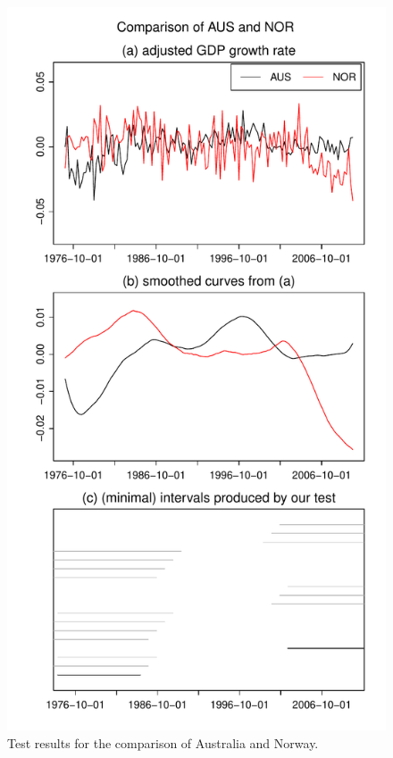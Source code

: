 \documentclass[a4paper,12pt]{article}
\begin{document}


\begin{figure}
\begin{minipage}[t]{0.24\textwidth}
\includegraphics[width=\textwidth]{output/plots/gdp/AUS_vs_NOR}
\caption{Test results for the comparison of Australia and Norway.}\label{fig:Australia:Norway}

\end{minipage}
\end{figure}
\end{document}
